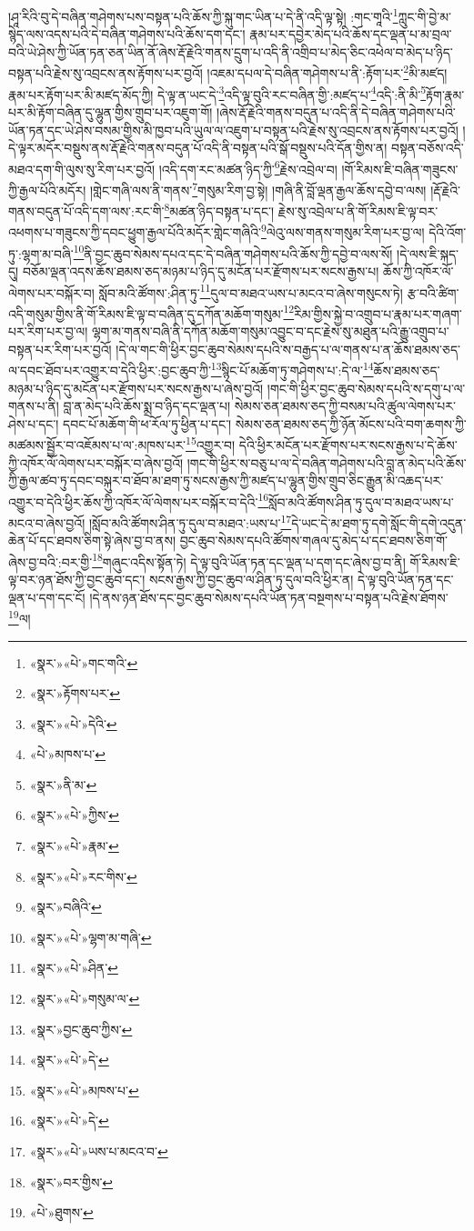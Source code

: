 །ཤཱ་རིའི་བུ་དེ་བཞིན་གཤེགས་པས་བསྟན་པའི་ཆོས་ཀྱི་སྐུ་གང་ཡིན་པ་དེ་ནི་འདི་ལྟ་སྟེ། :གང་གཱའི་\footnote{«སྣར་»«པེ་»གང་གའི་}ཀླུང་གི་བྱེ་མ་སྙེད་ལས་འདས་པའི་དེ་བཞིན་གཤེགས་པའི་ཆོས་དག་དང་། རྣམ་པར་དབྱེར་མེད་པའི་ཆོས་དང་ལྡན་པ་མ་བྲལ་བའི་ཡེ་ཤེས་ཀྱི་ཡོན་ཏན་ཅན་ཡིན་ནོ་ཞེས་རྡོ་རྗེའི་གནས་དྲུག་པ་འདི་ནི་འགྲིབ་པ་མེད་ཅིང་འཕེལ་བ་མེད་པ་ཉིད་བསྟན་པའི་རྗེས་སུ་འབྲངས་ནས་རྟོགས་པར་བྱའོ། །འཇམ་དཔལ་དེ་བཞིན་གཤེགས་པ་ནི་:རྟོག་པར་\footnote{«སྣར་»རྟོགས་པར་}མི་མཛད། རྣམ་པར་རྟོག་པར་མི་མཛད་མོད་ཀྱི། དེ་ལྟ་ན་ཡང་དེ་\footnote{«སྣར་»«པེ་»དེའི་}འདི་ལྟ་བུའི་རང་བཞིན་གྱི་:མཛད་པ་\footnote{«པེ་»མཁས་པ་}འདི་:ནི་མི་\footnote{«སྣར་»ནི་མ་}རྟོག་རྣམ་པར་མི་རྟོག་བཞིན་དུ་ལྷུན་གྱིས་གྲུབ་པར་འཇུག་གོ། །ཞེས་རྡོ་རྗེའི་གནས་བདུན་པ་འདི་ནི་དེ་བཞིན་གཤེགས་པའི་ཡོན་ཏན་དང་ཡེ་ཤེས་བསམ་གྱིས་མི་ཁྱབ་པའི་ཡུལ་ལ་འཇུག་པ་བསྟན་པའི་རྗེས་སུ་འབྲངས་ནས་རྟོགས་པར་བྱའོ། །དེ་ལྟར་མདོར་བསྡུས་ནས་རྡོ་རྗེའི་གནས་བདུན་པོ་འདི་ནི་བསྟན་པའི་སྒོ་བསྡུས་པའི་དོན་གྱིས་ན། བསྟན་བཅོས་འདི་མཐའ་དག་གི་ལུས་སུ་རིག་པར་བྱའོ། །འདི་དག་རང་མཚན་ཉིད་ཀྱི་\footnote{«སྣར་»«པེ་»ཀྱིས་}རྗེས་འབྲེལ་བ། །གོ་རིམས་ཇི་བཞིན་གཟུངས་ཀྱི་རྒྱལ་པོའི་མདོར། །གླེང་གཞི་ལས་ནི་གནས་\footnote{«སྣར་»«པེ་»རྣམ་}གསུམ་རིག་བྱ་སྟེ། །གཞི་ནི་བློ་ལྡན་རྒྱལ་ཆོས་དབྱེ་བ་ལས། །རྡོ་རྗེའི་གནས་བདུན་པོ་འདི་དག་ལས་:རང་གི་\footnote{«སྣར་»«པེ་»རང་གིས་}མཚན་ཉིད་བསྟན་པ་དང་། རྗེས་སུ་འབྲེལ་པ་ནི་གོ་རིམས་ཇི་ལྟ་བར་འཕགས་པ་གཟུངས་ཀྱི་དབང་ཕྱུག་རྒྱལ་པོའི་མདོར་གླེང་གཞིའི་\footnote{«སྣར་»བཞིའི་}ལེའུ་ལས་གནས་གསུམ་རིག་པར་བྱ་ལ། དེའི་འོག་ཏུ་:ལྷག་མ་བཞི་\footnote{«སྣར་»«པེ་»ལྷག་མ་གཞི་}ནི་བྱང་ཆུབ་སེམས་དཔའ་དང་དེ་བཞིན་གཤེགས་པའི་ཆོས་ཀྱི་དབྱེ་བ་ལས་སོ། །དེ་ལས་ཇི་སྐད་དུ། བཅོམ་ལྡན་འདས་ཆོས་ཐམས་ཅད་མཉམ་པ་ཉིད་དུ་མངོན་པར་རྫོགས་པར་སངས་རྒྱས་པ། ཆོས་ཀྱི་འཁོར་ལོ་ལེགས་པར་བསྐོར་བ། སློབ་མའི་ཚོགས་:ཤིན་ཏུ་\footnote{«སྣར་»«པེ་»ཤིན་}དུལ་བ་མཐའ་ཡས་པ་མངའ་བ་ཞེས་གསུངས་ཏེ། རྩ་བའི་ཚིག་འདི་གསུམ་གྱིས་ནི་གོ་རིམས་ཇི་ལྟ་བ་བཞིན་དུ་དཀོན་མཆོག་གསུམ་\footnote{«སྣར་»«པེ་»གསུམ་ལ་}རིམ་གྱིས་སྐྱེ་བ་འགྲུབ་པ་རྣམ་པར་གཞག་པར་རིག་པར་བྱ་ལ། ལྷག་མ་གནས་བཞི་ནི་དཀོན་མཆོག་གསུམ་འབྱུང་བ་དང་རྗེས་སུ་མཐུན་པའི་རྒྱུ་འགྲུབ་པ་བསྟན་པར་རིག་པར་བྱའོ། །དེ་ལ་གང་གི་ཕྱིར་བྱང་ཆུབ་སེམས་དཔའི་ས་བརྒྱད་པ་ལ་གནས་པ་ན་ཆོས་ཐམས་ཅད་ལ་དབང་ཐོབ་པར་འགྱུར་བ་དེའི་ཕྱིར་:བྱང་ཆུབ་ཀྱི་\footnote{«སྣར་»བྱང་ཆུབ་ཀྱིས་}སྙིང་པོ་མཆོག་ཏུ་གཤེགས་པ་:དེ་ལ་\footnote{«སྣར་»«པེ་»དེ་}ཆོས་ཐམས་ཅད་མཉམ་པ་ཉིད་དུ་མངོན་པར་རྫོགས་པར་སངས་རྒྱས་པ་ཞེས་བྱའོ། །གང་གི་ཕྱིར་བྱང་ཆུབ་སེམས་དཔའི་ས་དགུ་པ་ལ་གནས་པ་ནི། བླ་ན་མེད་པའི་ཆོས་སྨྲ་བ་ཉིད་དང་ལྡན་པ། སེམས་ཅན་ཐམས་ཅད་ཀྱི་བསམ་པའི་ཚུལ་ལེགས་པར་ཤེས་པ་དང་། དབང་པོ་མཆོག་གི་ཕ་རོལ་ཏུ་ཕྱིན་པ་དང་། སེམས་ཅན་ཐམས་ཅད་ཀྱི་ཉོན་མོངས་པའི་བག་ཆགས་ཀྱི་མཚམས་སྦྱོར་བ་འཇོམས་པ་ལ་:མཁས་པར་\footnote{«སྣར་»«པེ་»མཁས་པ་}འགྱུར་བ། དེའི་ཕྱིར་མངོན་པར་རྫོགས་པར་སངས་རྒྱས་པ་དེ་ཆོས་ཀྱི་འཁོར་ལོ་ལེགས་པར་བསྐོར་བ་ཞེས་བྱའོ། །གང་གི་ཕྱིར་ས་བཅུ་པ་ལ་དེ་བཞིན་གཤེགས་པའི་བླ་ན་མེད་པའི་ཆོས་ཀྱི་རྒྱལ་ཚབ་ཏུ་དབང་བསྐུར་བ་ཐོབ་མ་ཐག་ཏུ་སངས་རྒྱས་ཀྱི་མཛད་པ་ལྷུན་གྱིས་གྲུབ་ཅིང་རྒྱུན་མི་འཆད་པར་འགྱུར་བ་དེའི་ཕྱིར་ཆོས་ཀྱི་འཁོར་ལོ་ལེགས་པར་བསྐོར་བ་དེའི་\footnote{«སྣར་»«པེ་»དེ་}སློབ་མའི་ཚོགས་ཤིན་ཏུ་དུལ་བ་མཐའ་ཡས་པ་མངའ་བ་ཞེས་བྱའོ། །སློབ་མའི་ཚོགས་ཤིན་ཏུ་དུལ་བ་མཐའ་:ཡས་པ་\footnote{«སྣར་»«པེ་»ཡས་པ་མངའ་བ་}དེ་ཡང་དེ་མ་ཐག་ཏུ་དགེ་སློང་གི་དགེ་འདུན་ཆེན་པོ་དང་ཐབས་ཅིག་སྟེ་ཞེས་བྱ་བ་ནས། བྱང་ཆུབ་སེམས་དཔའི་ཚོགས་གཞལ་དུ་མེད་པ་དང་ཐབས་ཅིག་གོ་ཞེས་བྱ་བའི་:བར་གྱི་\footnote{«སྣར་»བར་གྱིས་}གཞུང་འདིས་སྟོན་ཏེ། དེ་ལྟ་བུའི་ཡོན་ཏན་དང་ལྡན་པ་དག་དང་ཞེས་བྱ་བ་ནི། གོ་རིམས་ཇི་ལྟ་བར་ཉན་ཐོས་ཀྱི་བྱང་ཆུབ་དང་། སངས་རྒྱས་ཀྱི་བྱང་ཆུབ་ལ་ཤིན་ཏུ་དུལ་བའི་ཕྱིར་ན། དེ་ལྟ་བུའི་ཡོན་ཏན་དང་ལྡན་པ་དག་དང་ངོ། །དེ་ནས་ཉན་ཐོས་དང་བྱང་ཆུབ་སེམས་དཔའི་ཡོན་ཏན་བསྔགས་པ་བསྟན་པའི་རྗེས་ཐོགས་\footnote{«པེ་»ཐུགས་}ལ། 